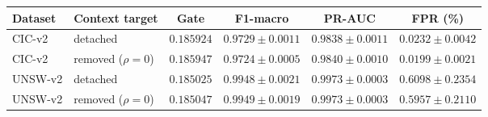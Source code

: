 \begin{tabular}{llcccc}
\toprule
Dataset & Context target & Gate & F1-macro & PR-AUC & FPR (\%) \\
\midrule
CIC-v2 & detached & $0.185924$ & $0.9729\pm0.0011$ & $0.9838\pm0.0011$ & $0.0232\pm0.0042$ \\
CIC-v2 & removed ($\rho=0$) & $0.185947$ & $0.9724\pm0.0005$ & $0.9840\pm0.0010$ & $0.0199\pm0.0021$ \\
UNSW-v2 & detached & $0.185025$ & $0.9948\pm0.0021$ & $0.9973\pm0.0003$ & $0.6098\pm0.2354$ \\
UNSW-v2 & removed ($\rho=0$) & $0.185047$ & $0.9949\pm0.0019$ & $0.9973\pm0.0003$ & $0.5957\pm0.2110$ \\
\bottomrule
\end{tabular}
